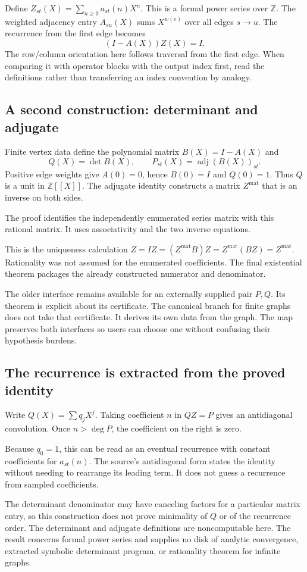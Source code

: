 Define $Z_{st}(X)=\sum_{n\ge0}a_{st}(n)X^n$. This is a formal power series over $\mathbb Z$. The weighted adjacency entry $A_{su}(X)$ sums $X^{w(e)}$ over all edges $s\to u$. The recurrence from the first edge becomes
\[
(I-A(X))Z(X)=I.
\]
The row/column orientation here follows traversal from the first edge. When comparing it with operator blocks with the output index first, read the definitions rather than transferring an index convention by analogy.

\subsection{A second construction: determinant and adjugate}

Finite vertex data define the polynomial matrix $B(X)=I-A(X)$ and
\[
Q(X)=\det B(X),\qquad P_{st}(X)=\operatorname{adj}(B(X))_{st}.
\]
Positive edge weights give $A(0)=0$, hence $B(0)=I$ and $Q(0)=1$. Thus $Q$ is a unit in $\mathbb Z[\![X]\!]$. The adjugate identity constructs a matrix $Z^{\mathrm{mat}}$ that is an inverse on both sides.

The proof identifies the independently enumerated series matrix with this rational matrix. It uses associativity and the two inverse equations.

This is the uniqueness calculation $Z=I Z=(Z^{\mathrm{mat}}B)Z=Z^{\mathrm{mat}}(BZ)=Z^{\mathrm{mat}}$. Rationality was not assumed for the enumerated coefficients. The final existential theorem packages the already constructed numerator and denominator.

The older  interface remains available for an externally supplied pair $P,Q$. Its theorem is explicit about its certificate. The canonical branch for finite graphs does not take that certificate. It derives its own data from the graph. The map preserves both interfaces so users can choose one without confusing their hypothesis burdens.

\subsection{The recurrence is extracted from the proved identity}

Write $Q(X)=\sum q_jX^j$. Taking coefficient $n$ in $QZ=P$ gives an antidiagonal convolution. Once $n>\deg P$, the coefficient on the right is zero.

Because $q_0=1$, this can be read as an eventual recurrence with constant coefficients for $a_{st}(n)$. The source's antidiagonal form states the identity without needing to rearrange its leading term. It does not guess a recurrence from sampled coefficients.

The determinant denominator may have canceling factors for a particular matrix entry, so this construction does not prove minimality of $Q$ or of the recurrence order. The determinant and adjugate definitions are noncomputable here. The result concerns formal power series and supplies no disk of analytic convergence, extracted symbolic determinant program, or rationality theorem for infinite graphs.

